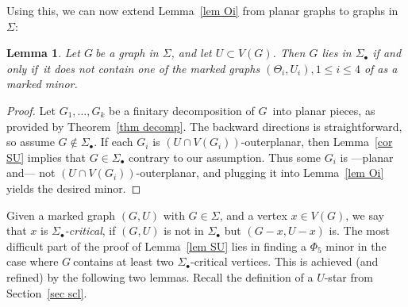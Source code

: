 \documentclass{article}
\newcommand{\SU}{\ensuremath{\Sig_\bullet}}
\newcommand{\Sig}{\ensuremath{\Sigma}}
\newcommand{\defi}[1]{{\color{darkgray}\emph{#1}}}
\newtheorem{lemma}[proposition]{Lemma}
\newcommand{\g}{\ensuremath{G\ }}
\newcommand{\G}{\ensuremath{G}}
\newcommand{\OP}{outerplanar}
\newcommand{\Lr}[1]{Lemma~\ref{#1}}
\newcommand{\Tr}[1]{Theorem~\ref{#1}}
\newcommand{\Sr}[1]{Section~\ref{#1}}
\renewcommand{\iff}{if and only if}
\begin{document}
Using this, we can now extend \Lr{lem Oi} from planar graphs to graphs in \Sig:

\begin{lemma} \label{lem STh}
Let \g be a  graph in \Sig, and let $U\subset V(G)$. Then $G$ lies in  $\SU$ \iff\ it does not contain one of the marked graphs $(\Theta_i,U_i), 1\leq i \leq 4$ of  as a marked minor. 
\end{lemma}
\begin{proof}
Let $G_1,\ldots, G_k$ be a finitary decomposition of \G\ into planar pieces, as provided by \Tr{thm decomp}. The backward directions is straightforward, so assume $G \not\in \SU$. If each $G_i$ is $(U\cap V(G_i))$-\OP, then \Lr{cor SU} implies that $G \in \SU$ contrary to our assumption. Thus some $G_i$ is ---planar and--- not $(U\cap V(G_i))$-\OP, and plugging it into \Lr{lem Oi} yields the desired minor.
\end{proof}

Given a marked graph $(G,U)$ with $G\in \Sig$, and a vertex $x\in V(G)$, we say that $x$ is \defi{\SU-critical}, if $(G,U)$ is not in $\SU$ but $(G-x,U-x)$ is. The most difficult part of the proof of \Lr{lem SU} lies in finding a $\Phi_5$ minor in the case where \g contains at least two \SU-critical vertices. This is achieved (and refined) by the following two lemmas. Recall the definition of a $U$-star from \Sr{sec scl}.
\end{document}
